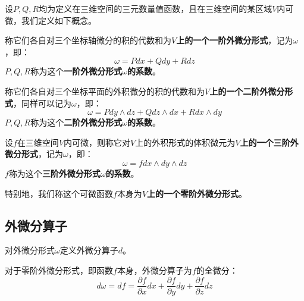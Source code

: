 \begin{definition}[外微分形式]
设$P,Q,R$均为定义在三维空间的三元数量值函数，且在三维空间的某区域$V$内可微，我们定义如下概念。

称它们各自对三个坐标轴微分的积的代数和为{\bf $V$上的一个一阶外微分形式}，记为$\omega $，即：
\[
\omega =Pdx+Qdy+Rdz
\]
$P,Q,R$称为这个{\bf 一阶外微分形式$\omega $的系数}。

称它们各自对三个坐标平面的外积微分的积的代数和为{\bf $V$上的一个二阶外微分形式}，同样可以记为$\omega $，即：
\[
\omega =Pdy\land dz+Qdz\land dx+Rdx\land dy
\]
$P,Q,R$称为这个{\bf 二阶外微分形式$\omega $的系数}。

设$f$在三维空间$V$内可微，则称它对$V$上的外积形式的体积微元为{\bf $V$上的一个三阶外微分形式}，记为$\omega $，即：
\[
\omega =fdx\land dy\land dz
\]
$f$称为这个{\bf 三阶外微分形式$\omega $的系数}。

特别地，我们称这个可微函数$f$本身为{\bf $V$上的一个零阶外微分形式}。

\end{definition}

\subsection{外微分算子}

对外微分形式$\omega $定义外微分算子$d$。

对于零阶外微分形式，即函数$f$本身，外微分算子为$f$的全微分：
\[
d\omega =df=\frac{\partial f}{\partial x}dx+\frac{\partial f}{\partial y}dy+\frac{\partial f}{\partial z}dz
\]


